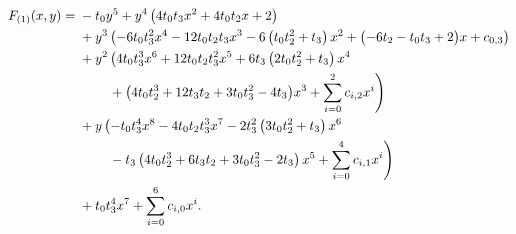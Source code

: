 \begin{align}
    \label{curve:ising_fixed}
    F_{(1)}(x,y)={} & -t_0y^{5}{}+y^{4}\left(4 t_0 t_3x^{2} + 4 t_0 t_2x + 2\right)\notag \\
                    & {}+y^{3}\left(-6 t_0 t_3^2x^{4} - 12 t_0 t_2 t_3x^{3} - 6 \left(t_0 t_2^2+t_3\right)x^{2} + \bigl(-6 t_2-t_0 t_3+2\bigr)x + c_{0,3}\right)\notag \\
                    & {}+y^{2}\left(4 t_0 t_3^3x^{6} + 12 t_0 t_2 t_3^2x^{5} + 6 t_3 \left(2 t_0 t_2^2+t_3\right)x^{4}\right.\notag \\*
                    & \qquad{}\left.{}+ \bigl(4 t_0 t_2^3+12 t_3 t_2+3 t_0 t_3^2-4 t_3\bigr)x^{3} + \sum_{i=0}^{2}c_{i,2}x^i\right)\notag \\
                    & {}+y\left(-t_0 t_3^4x^{8} - 4 t_0 t_2 t_3^3x^{7} - 2 t_3^2 \left(3 t_0 t_2^2+t_3\right)x^{6}\right.\notag \\*
                    & \qquad{}\left.{}- t_3 \left(4 t_0 t_2^3+6 t_3 t_2+3 t_0 t_3^2-2 t_3\right)x^{5} + \sum_{i=0}^{4}c_{i,1}x^i\right)\notag \\
                    & {}+t_0 t_3^4x^{7} + \sum_{i=0}^{6}c_{i,0}x^i.
\end{align}
